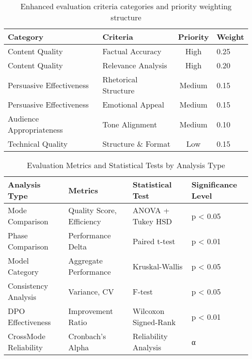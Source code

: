 \begin{table}[htbp]
    \centering
    \caption{Enhanced evaluation criteria categories and priority weighting structure}
    \label{tab:evaluation-criteria}
    \begin{tabular}{|l|l|c|l|}
    \hline
    \textbf{Category} & \textbf{Criteria} & \textbf{Priority} & \textbf{Weight} \\
    \hline
    Content Quality & Factual Accuracy & High & 0.25 \\
    Content Quality & Relevance Analysis & High & 0.20 \\
    Persuasive Effectiveness & Rhetorical Structure & Medium & 0.15 \\
    Persuasive Effectiveness & Emotional Appeal & Medium & 0.15 \\
    Audience Appropriateness & Tone Alignment & Medium & 0.10 \\
    Technical Quality & Structure \& Format & Low & 0.15 \\
    \hline
    \end{tabular}
\end{table}

\begin{table}[htbp]
    \centering
    \caption{Evaluation Metrics and Statistical Tests by Analysis Type}
    \label{tab:evaluation-metrics-tests}
    \begin{tabular}{|l|l|l|l|}
    \hline
    \textbf{Analysis Type} & \textbf{Metrics} & \textbf{Statistical Test} & \textbf{Significance Level} \\
    \hline
    Mode Comparison & Quality Score, Efficiency & ANOVA + Tukey HSD & p < 0.05 \\
    Phase Comparison & Performance Delta & Paired t-test & p < 0.01 \\
    Model Category & Aggregate Performance & Kruskal-Wallis & p < 0.05 \\
    Consistency Analysis & Variance, CV & F-test & p < 0.05 \\
    DPO Effectiveness & Improvement Ratio & Wilcoxon Signed-Rank & p < 0.01 \\
    Cross\-Mode Reliability & Cronbach's Alpha & Reliability Analysis & α \> 0.80 \\
    \hline
    \end{tabular}
\end{table}

